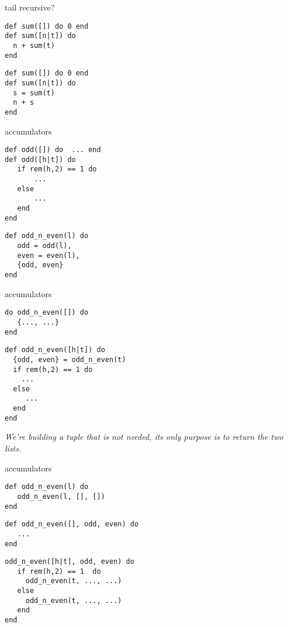 \begin{frame}[fragile]{tail recursive?}

\begin{verbatim}
def sum([]) do 0 end
def sum([n|t]) do 
  n + sum(t) 
end
\end{verbatim}

\pause
\begin{verbatim}
def sum([]) do 0 end
def sum([n|t]) do 
  s = sum(t)
  n + s
end
\end{verbatim}

\end{frame}

\begin{frame}[fragile]{accumulators}

\begin{verbatim}
def odd([]) do  ... end
def odd([h|t]) do
   if rem(h,2) == 1 do
       ... 
   else 
       ...
   end
end
\end{verbatim}
\pause

\begin{verbatim}
def odd_n_even(l) do
   odd = odd(l),
   even = even(l),
   {odd, even}
end
\end{verbatim}
\end{frame}

\begin{frame}[fragile]{accumulators}

\begin{verbatim}
do odd_n_even([]) do
   {..., ...}
end
\end{verbatim}
\pause
\begin{verbatim}
def odd_n_even([h|t]) do
  {odd, even} = odd_n_even(t)
  if rem(h,2) == 1 do
    ...
  else 
     ...
  end
end
\end{verbatim}

\vspace{40pt}
{\em We're building a tuple that is not needed, its only purpose is to return the two lists.}

\end{frame}


\begin{frame}[fragile]{accumulators}

\pause
\begin{verbatim}
def odd_n_even(l) do 
   odd_n_even(l, [], [])
end
\end{verbatim}

\pause
\begin{verbatim}
def odd_n_even([], odd, even) do
   ...
end
\end{verbatim}
\pause
\begin{verbatim}
odd_n_even([h|t], odd, even) do
   if rem(h,2) == 1  do 
     odd_n_even(t, ..., ...)
   else
     odd_n_even(t, ..., ...) 
   end
end
\end{verbatim}

\end{frame}

